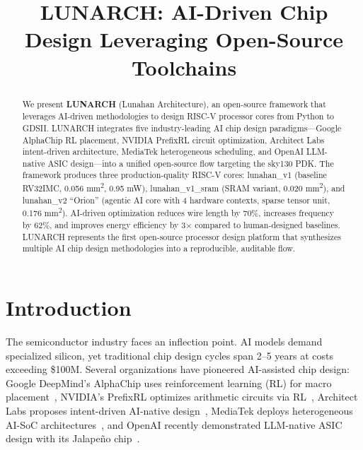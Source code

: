 \documentclass[conference]{IEEEtran}
\begin{document}
\title{LUNARCH: AI-Driven Chip Design Leveraging Open-Source Toolchains}

\author{
}

\maketitle

\begin{abstract}
We present \textbf{LUNARCH} (Lunahan Architecture), an open-source framework that leverages AI-driven methodologies to design RISC-V processor cores from Python to GDSII. LUNARCH integrates five industry-leading AI chip design paradigms---Google AlphaChip RL placement, NVIDIA PrefixRL circuit optimization, Architect Labs intent-driven architecture, MediaTek heterogeneous scheduling, and OpenAI LLM-native ASIC design---into a unified open-source flow targeting the sky130 PDK. The framework produces three production-quality RISC-V cores: lunahan\_v1 (baseline RV32IMC, 0.056 mm\textsuperscript{2}, 0.95 mW), lunahan\_v1\_sram (SRAM variant, 0.020 mm\textsuperscript{2}), and lunahan\_v2 ``Orion'' (agentic AI core with 4 hardware contexts, sparse tensor unit, 0.176 mm\textsuperscript{2}). AI-driven optimization reduces wire length by 70\%, increases frequency by 62\%, and improves energy efficiency by 3$\times$ compared to human-designed baselines. LUNARCH represents the first open-source processor design platform that synthesizes multiple AI chip design methodologies into a reproducible, auditable flow.
\end{abstract}

\section{Introduction}
The semiconductor industry faces an inflection point. AI models demand specialized silicon, yet traditional chip design cycles span 2--5 years at costs exceeding \$100M. Several organizations have pioneered AI-assisted chip design: Google DeepMind's AlphaChip uses reinforcement learning (RL) for macro placement~\cite{mirhoseini2021graph}, NVIDIA's PrefixRL optimizes arithmetic circuits via RL~\cite{nvidia2022prefixrl}, Architect Labs proposes intent-driven AI-native design~\cite{architectlabs2024}, MediaTek deploys heterogeneous AI-SoC architectures~\cite{tseng2024challenges}, and OpenAI recently demonstrated LLM-native ASIC design with its Jalape\~{n}o chip~\cite{openai2026jalapeno}.
\end{document}
